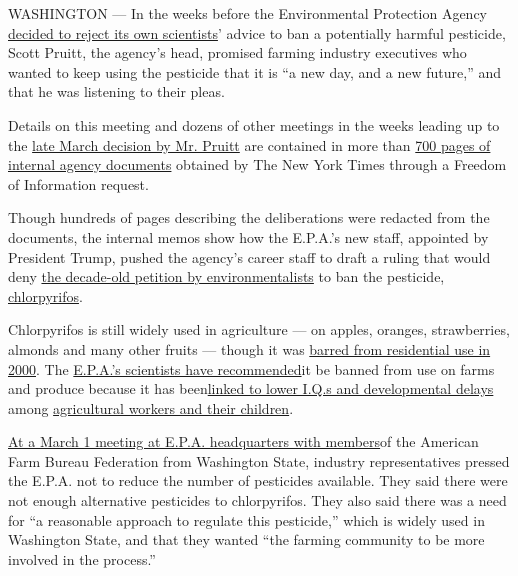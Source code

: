 WASHINGTON --- In the weeks before the Environmental Protection Agency
\href{https://www.nytimes3xbfgragh.onion/2017/03/29/us/politics/epa-insecticide-chlorpyrifos.html?mcubz=3\&_r=0}{decided
to reject its own scientists}' advice to ban a potentially harmful
pesticide, Scott Pruitt, the agency's head, promised farming industry
executives who wanted to keep using the pesticide that it is ``a new
day, and a new future,'' and that he was listening to their pleas.

Details on this meeting and dozens of other meetings in the weeks
leading up to the
\href{https://www.epa.gov/sites/production/files/2017-03/documents/chlorpyrifos3b_order_denying_panna_and_nrdc27s_petitition_to_revoke_tolerances.pdf}{late
March decision by Mr. Pruitt} are contained in more than
\href{https://www.documentcloud.org/documents/3935290-EPA-HQ-2017-005731-Redacted.html}{700
pages of internal agency documents} obtained by The New York Times
through a Freedom of Information request.

Though hundreds of pages describing the deliberations were redacted from
the documents, the internal memos show how the E.P.A.'s new staff,
appointed by President Trump, pushed the agency's career staff to draft
a ruling that would deny
\href{https://www.nrdc.org/sites/default/files/hea_10072201a.pdf}{the
decade-old petition by environmentalists} to ban the pesticide,
\href{https://www.epa.gov/ingredients-used-pesticide-products/chlorpyrifos}{chlorpyrifos}.

Chlorpyrifos is still widely used in agriculture --- on apples, oranges,
strawberries, almonds and many other fruits --- though it was
\href{http://www.nytimes3xbfgragh.onion/2000/06/09/us/epa-citing-risks-to-children-signs-accord-to-limit-insecticide.html}{barred
from residential use in 2000}. The
\href{https://www.regulations.gov/document?D=EPA-HQ-OPP-2015-0653-0001}{E.P.A.'s
scientists have recommended}it be banned from use on farms and produce
because it has
been\href{https://www.mailman.columbia.edu/public-health-now/news/pesticide-chlorpyrifos-linked-childhood-developmental-delays}{linked
to lower I.Q.s and developmental delays} among
\href{http://www.google.com/url?q=http\%3A\%2F\%2Frepository.usfca.edu\%2Fcapstone\%2F529\%2F\&sa=D\&sntz=1\&usg=AFQjCNFl-3uwWNpfUbCJd4f0OuRRVxcvwA}{agricultural
workers and their children}.

\href{https://www.documentcloud.org/documents/3935290-EPA-HQ-2017-005731-Redacted.html\#document/p32/a369099}{At
a March 1 meeting at E.P.A. headquarters with members}of the American
Farm Bureau Federation from Washington State, industry representatives
pressed the E.P.A. not to reduce the number of pesticides available.
They said there were not enough alternative pesticides to chlorpyrifos.
They also said there was a need for ``a reasonable approach to regulate
this pesticide,'' which is widely used in Washington State, and that
they wanted ``the farming community to be more involved in the
process.''

